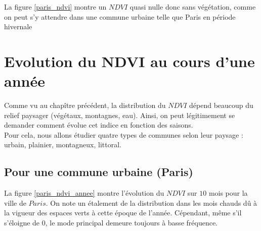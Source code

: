 \documentclass{book}
\begin{document}
La figure \ref{paris_ndvi} montre un $NDVI$ quasi nulle donc sans végétation, comme on peut s'y attendre dans une commune urbaine telle que Paris en période hivernale\\

\clearpage


\chapter{Evolution du NDVI au cours d'une année}

Comme vu au chapître précédent, la distribution du $NDVI$ dépend beaucoup du relief paysager (végétaux, montagnes, eau).
Ainsi, on peut légitimement se demander comment évolue cet indice en fonction des saisons.\\
Pour cela, nous allons étudier quatre types de communes selon leur paysage : urbain, plainier, montagneux, littoral.\\

\section{Pour une commune urbaine (Paris)}

La figure \ref{paris_ndvi_annee} montre l'évolution du $NDVI$ sur $10$ mois pour la ville de $Paris$. On note un étalement de la distribution 
dans les mois chauds d\^u à la vigueur des espaces verts à cette époque de l'année. Cépendant, même s'il s'éloigne de 0, le mode principal 
demeure toujours à basse fréquence.
\end{document}
